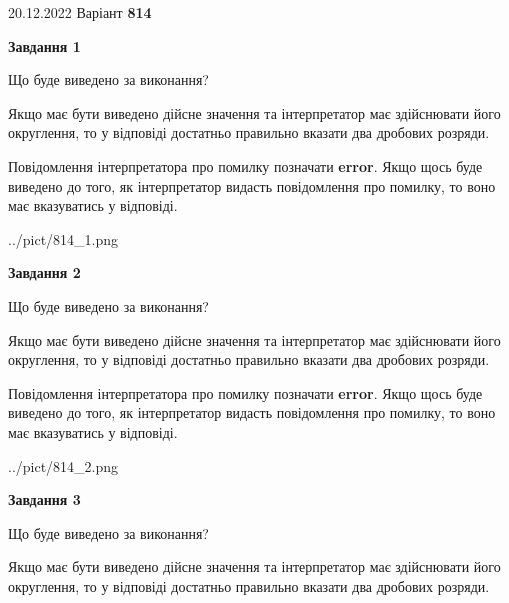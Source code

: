 \documentclass[12pt, ukrainian]{article}
\begin{document}
{20.12.2022 Варіант \No \textbf { 814 }\par}
{
\begin {Large}

{\begin {center}\textbf{Завдання 1}\end {center}}\par
Що буде виведено за виконання? \par

Якщо має бути виведено дійсне значення та інтерпретатор має здійснювати його округлення, 
то у відповіді достатньо правильно вказати два дробових розряди.

Повідомлення інтерпретатора про помилку позначати \textbf{error}.
Якщо щось буде виведено до того, як інтерпретатор видасть повідомлення про помилку, 
то воно має вказуватись у відповіді. \par

\begin{center}
	{../pict/814_1.png}
\end{center}
\newpage

{\begin {center}\textbf{Завдання 2}\end {center}}\par
Що буде виведено за виконання? \par

Якщо має бути виведено дійсне значення та інтерпретатор має здійснювати його округлення, 
то у відповіді достатньо правильно вказати два дробових розряди.

Повідомлення інтерпретатора про помилку позначати \textbf{error}.
Якщо щось буде виведено до того, як інтерпретатор видасть повідомлення про помилку, 
то воно має вказуватись у відповіді. \par

\begin{center}
	{../pict/814_2.png}
\end{center}
\newpage

{\begin {center}\textbf{Завдання 3}\end {center}}\par
Що буде виведено за виконання? \par

Якщо має бути виведено дійсне значення та інтерпретатор має здійснювати його округлення, 
то у відповіді достатньо правильно вказати два дробових розряди.


\end{Large}}
\end{document}
